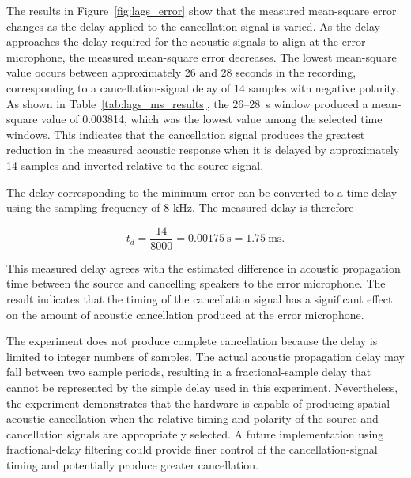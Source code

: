The results in Figure~\ref{fig:lags_error} show that the measured mean-square error changes as the delay applied to the cancellation signal is varied. As the delay approaches the delay required for the acoustic signals to align at the error microphone, the measured mean-square error decreases. The lowest mean-square value occurs between approximately 26 and 28 seconds in the recording, corresponding to a cancellation-signal delay of 14 samples with negative polarity. As shown in Table~\ref{tab:lags_ms_results}, the 26--28~s window produced a mean-square value of 0.003814, which was the lowest value among the selected time windows. This indicates that the cancellation signal produces the greatest reduction in the measured acoustic response when it is delayed by approximately 14 samples and inverted relative to the source signal.

The delay corresponding to the minimum error can be converted to a time delay using the sampling frequency of 8 kHz. The measured delay is therefore

$$
t_d = \frac{14}{8000} = 0.00175~\text{s} = 1.75~\text{ms}.
$$

This measured delay agrees with the estimated difference in acoustic propagation time between the source and cancelling speakers to the error microphone. The result indicates that the timing of the cancellation signal has a significant effect on the amount of acoustic cancellation produced at the error microphone.

The experiment does not produce complete cancellation because the delay is limited to integer numbers of samples. The actual acoustic propagation delay may fall between two sample periods, resulting in a fractional-sample delay that cannot be represented by the simple delay used in this experiment. Nevertheless, the experiment demonstrates that the hardware is capable of producing spatial acoustic cancellation when the relative timing and polarity of the source and cancellation signals are appropriately selected. A future implementation using fractional-delay filtering could provide finer control of the cancellation-signal timing and potentially produce greater cancellation.

